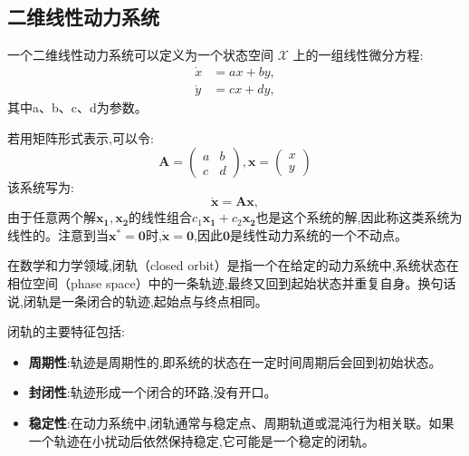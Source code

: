\subsection{二维线性动力系统}
\begin{defn}[二维线性动力系统]

    一个二维线性动力系统可以定义为一个状态空间 $\mathcal{X}$ 上的一组线性微分方程:
    \begin{equation}
        \begin{aligned}
            \dot{x} & = a x + b y, \\
            \dot{y} & = c x + d y,
        \end{aligned}
    \end{equation}
    其中a、b、c、d为参数。
\end{defn}
若用矩阵形式表示,可以令:
\begin{equation}
    \mathbf{A}= \begin{pmatrix}
        a & b \\
        c & d
    \end{pmatrix},\mathbf{x}=\begin{pmatrix}
        x \\y
    \end{pmatrix}
\end{equation}
该系统写为:
\begin{equation}
    \dot{\mathbf{x}}=\mathbf{A}\mathbf{x},
\end{equation}
由于任意两个解$\mathbf{x_1},\mathbf{x_2}$的线性组合$c_1\mathbf{x_1}+c_2\mathbf{x_2}$也是这个系统的解,因此称这类系统为线性的。注意到当$\mathbf{x^*}=\mathbf{0}$时,$\dot{\mathbf{x}}=\mathbf{0}$,因此$\mathbf{0}$是线性动力系统的一个不动点。
\begin{defn}[闭轨]

    在数学和力学领域,闭轨（closed orbit）是指一个在给定的动力系统中,系统状态在相位空间（phase space）中的一条轨迹,最终又回到起始状态并重复自身。换句话说,闭轨是一条闭合的轨迹,起始点与终点相同。
\end{defn}
闭轨的主要特征包括:
\begin{itemize}
    \item \textbf{周期性}:轨迹是周期性的,即系统的状态在一定时间周期后会回到初始状态。
    \item \textbf{封闭性}:轨迹形成一个闭合的环路,没有开口。
    \item \textbf{稳定性}:在动力系统中,闭轨通常与稳定点、周期轨道或混沌行为相关联。如果一个轨迹在小扰动后依然保持稳定,它可能是一个稳定的闭轨。
\end{itemize}
